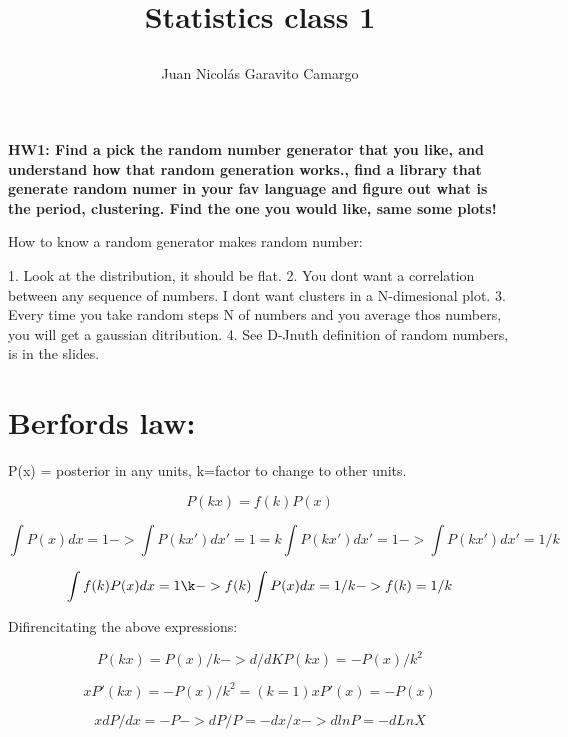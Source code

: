 \documentclass[12pt]{article}
\title{\begin{LARGE}
{Statistics class 1}
\end{LARGE}}
\author{Juan Nicol\'as Garavito Camargo}
\begin{document}
\maketitle

\textbf{HW1: Find a pick the random number generator that you like, and understand
how that random generation works., find a library that generate random
numer in your fav language and figure out what is the period,
clustering. Find the one you would like, same some plots! }

How to know a random generator makes random number:

1. Look at the distribution, it should be flat.
2. You dont want a correlation between any sequence of numbers. I dont
want clusters in a N-dimesional plot. 
3. Every time you take random steps N of numbers and you average thos
numbers, you will get a gaussian ditribution.
4. See D-Jnuth definition of random numbers, is in the slides.

\section{Berfords law:}

P(x) = posterior in any units, k=factor to change to other units.

\begin{equation}
P(kx) = f(k)P(x)
\end{equation}

\begin{equation}
\int P(x)dx = 1 -> \int P(kx') dx' = 1 = k \int P(kx')dx' = 1 -> \int
P(kx')dx' = 1/k
\end{equation}

\begin{equation}
\int f(k)P(x)dx = 1\k -> f(k) \int P(x)dx = 1/k -> f(k) = 1/k
\end{equation}

Difirencitating the above expressions:

\begin{equation}
P(kx) = P(x)/k -> d/dK P(kx) = - P(x)/k^2 
\end{equation}

\begin{equation}
x P'(kx) = - P(x)/k^2 = (k=1) xP'(x) = -P(x)
\end{equation}

\begin{equation}
x dP/dx = -P -> dP/P = - dx/x -> dlnP = -dLnX
\end{equation}
\end{document}
